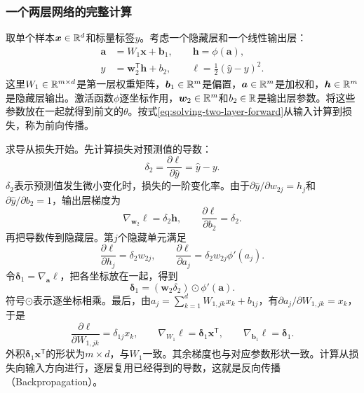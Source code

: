\subsubsection{一个两层网络的完整计算}
取单个样本$\bm x\in\mathbb{R}^d$和标量标签$y$。考虑一个隐藏层和一个线性输出层：
\begin{align}
 \bm a&=W_1\bm x+\bm b_1,\qquad \bm h=\phi(\bm a),\\
 \hat y&=\bm w_2^{\mathsf T}\bm h+b_2,\qquad
 \ell=\frac12(\hat y-y)^2.
 \label{eq:solving-two-layer-forward}
\end{align}
这里$W_1\in\mathbb{R}^{m\times d}$是第一层权重矩阵，$\bm b_1\in\mathbb{R}^m$是偏置，$\bm a\in\mathbb{R}^m$是加权和，$\bm h\in\mathbb{R}^m$是隐藏层输出。激活函数$\phi$逐坐标作用，$\bm w_2\in\mathbb{R}^m$和$b_2\in\mathbb{R}$是输出层参数。将这些参数放在一起就得到前文的$\theta$。按式\eqref{eq:solving-two-layer-forward}从输入计算到损失，称为前向传播。

求导从损失开始。先计算损失对预测值的导数：
\begin{equation}
 \delta_2=\frac{\partial\ell}{\partial\hat y}=\hat y-y.
\end{equation}
$\delta_2$表示预测值发生微小变化时，损失的一阶变化率。由于$\partial\hat y/\partial w_{2j}=h_j$和$\partial\hat y/\partial b_2=1$，输出层梯度为
\begin{equation}
 \nabla_{\bm w_2}\ell=\delta_2\bm h,\qquad
 \frac{\partial\ell}{\partial b_2}=\delta_2.
\end{equation}
再把导数传到隐藏层。第$j$个隐藏单元满足
\begin{equation}
 \frac{\partial\ell}{\partial h_j}=\delta_2w_{2j},\qquad
 \frac{\partial\ell}{\partial a_j}=\delta_2w_{2j}\phi'(a_j).
\end{equation}
令$\bm\delta_1=\nabla_{\bm a}\ell$，把各坐标放在一起，得到
\begin{equation}
 \bm\delta_1=(\bm w_2\delta_2)\odot\phi'(\bm a).
\end{equation}
符号$\odot$表示逐坐标相乘。最后，由$a_j=\sum_{k=1}^d W_{1,jk}x_k+b_{1j}$，有$\partial a_j/\partial W_{1,jk}=x_k$，于是
\begin{equation}
 \frac{\partial\ell}{\partial W_{1,jk}}=\delta_{1j}x_k,\qquad
 \nabla_{W_1}\ell=\bm\delta_1\bm x^{\mathsf T},\qquad
 \nabla_{\bm b_1}\ell=\bm\delta_1.
 \label{eq:solving-two-layer-backward}
\end{equation}
外积$\bm\delta_1\bm x^{\mathsf T}$的形状为$m\times d$，与$W_1$一致。其余梯度也与对应参数形状一致。计算从损失向输入方向进行，逐层复用已经得到的导数，这就是反向传播（Backpropagation）。

